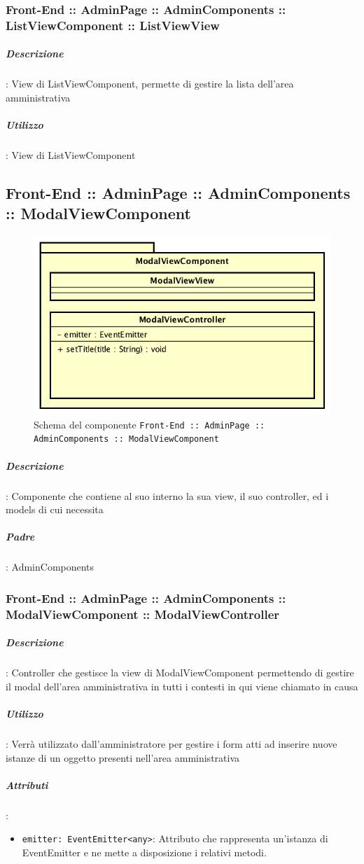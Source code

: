 \documentclass[../ManualeSviluppatore_v1.0.0.tex]{subfiles}
\begin{document}
			      \subsubsection{Front-End :: AdminPage :: AdminComponents :: ListViewComponent :: ListViewView}
			      	\subparagraph{Descrizione}: View di ListViewComponent, permette di gestire la lista dell'area amministrativa
			      	\subparagraph{Utilizzo}: View di ListViewComponent
\newpage
	\subsection{Front-End :: AdminPage :: AdminComponents :: ModalViewComponent}
	\begin{figure}[!h]
		\centering
		\includegraphics[scale=0.6]{Architettura/Front-End/AdminPage/AdminComponents/ModalViewComponent.png}
		\caption{Schema del componente \texttt{Front-End :: AdminPage :: AdminComponents :: ModalViewComponent}}
	\end{figure}

			\subparagraph{Descrizione}: Componente che contiene al suo interno la sua view, il suo controller, ed i models di cui necessita
			\subparagraph{Padre}: AdminComponents
				\subsubsection{Front-End :: AdminPage :: AdminComponents :: ModalViewComponent :: ModalViewController}
					\subparagraph{Descrizione}: Controller che gestisce la view di ModalViewComponent permettendo di gestire il modal dell'area amministrativa in tutti i contesti in qui viene chiamato in causa
					\subparagraph{Utilizzo}: Verrà utilizzato dall'amministratore per gestire i form atti ad inserire nuove istanze di un oggetto presenti nell'area amministrativa
					\subparagraph{Attributi}:
					      \begin{itemize}
			      	      	\item \texttt{emitter: EventEmitter<any>}: Attributo che rappresenta un'istanza di EventEmitter e ne mette a disposizione i relativi metodi.
			      	      \end{itemize}
\end{document}
